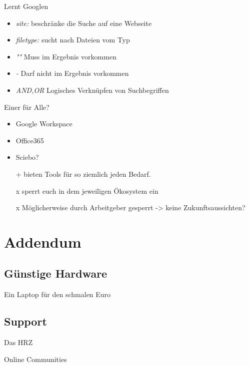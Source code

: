 \documentclass{beamer}
\begin{document}
\begin{frame}{Lernt Googlen}
    \begin{itemize}
        \item \textit{site:} beschränke die Suche auf eine Webseite
        \item \textit{filetype:} sucht nach Dateien vom Typ
        \item \textit{""}  Muss im Ergebnis vorkommen
        \item \textit{-} Darf nicht im Ergebnis vorkommen
        \item \textit{AND,OR} Logisches Verknüpfen von Suchbegriffen
    \end{itemize}
\end{frame}
\begin{frame}{Einer für Alle?}
    \begin{itemize}
        \item Google Workspace
        \item Office365
        \item Sciebo?
    \end{itemize}
    
    \begin{itemize}
        \item[+] bieten Tools für so ziemlich jeden Bedarf.
        \item[x] sperrt euch in dem jeweiligen Ökosystem ein
        \item[x] Möglicherweise durch Arbeitgeber gesperrt -> keine Zukunftsaussichten?
    \end{itemize}  
\end{frame}
\section{Addendum}
\subsection{Günstige Hardware}
\begin{frame}{Ein Laptop für den schmalen Euro}
    
\end{frame}
\subsection{Support}
\begin{frame}{Das HRZ}
    
\end{frame}
\begin{frame}{Online Communities}
    
\end{frame}
\end{document}
